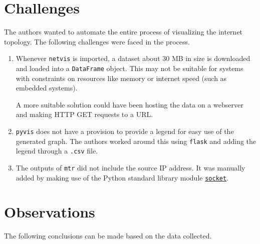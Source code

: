 \documentclass[journal,12pt,twocolumn]{IEEEtran}
\begin{document}
\section{Challenges}

The authors wanted to automate the entire process of visualizing the internet
topology. The following challenges were faced in the process.

\begin{enumerate}
     \item Whenever \texttt{netvis} is imported, a dataset about 30 MB in size
     is downloaded and loaded into a \texttt{DataFrame} object. This may not be
     suitable for systems with constraints on resources like memory or internet
     speed (such as embedded systems).

     A more suitable solution could have been hosting the data on a webserver
     and making HTTP GET requests to a URL.
     \item \texttt{pyvis} does not have a provision to provide a legend for easy
     use of the generated graph. The authors worked around this using
     \texttt{flask} and adding the legend through a \texttt{.csv} file.
     \item The outputs of \texttt{mtr} did not include the source IP address. It
     was manually added by making use of the Python standard library module
     \href{https://docs.python.org/3/library/socket.html}{\texttt{socket}}.
\end{enumerate}

\section{Observations}
The following conclusions can be made based on the data collected.
\end{document}

